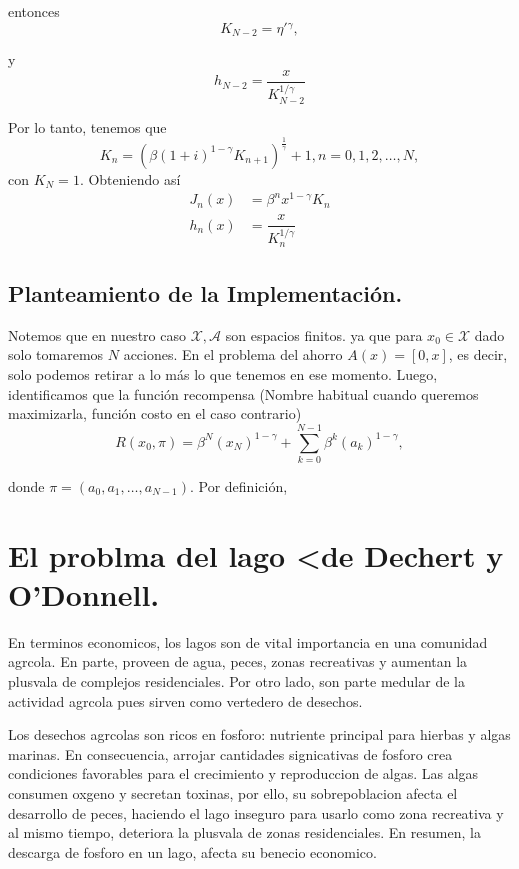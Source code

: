 \documentclass[oneside,spanish]{amsbook}
\numberwithin{section}{chapter}
\numberwithin{equation}{section}
\numberwithin{figure}{section}
\begin{document}
entonces 
\[
K_{N-2}=\eta'{}^{\gamma},
\]

y 
\[
h_{N-2}=\dfrac{x}{K_{N-2}^{1/\gamma}}
\]

Por lo tanto, tenemos que 
\[
K_{n}=\left(\beta\left(1+i\right)^{1-\gamma}K_{n+1}\right)^{\frac{1}{\gamma}}+1,n=0,1,2,\ldots,N,
\]
con $K_{N}=1$. Obteniendo así 
\begin{align*}
J_{n}\left(x\right) & =\beta^{n}x^{1-\gamma}K_{n}\\
h_{n}\left(x\right) & =\dfrac{x}{K_{n}^{1/\gamma}}
\end{align*}


\section{Planteamiento de la Implementación. }

Notemos que en nuestro caso $\mathcal{X},\mathcal{A}$ son espacios
finitos. ya que para $x_{0}\in\mathcal{X}$ dado solo tomaremos $N$
acciones. En el problema del ahorro $A\left(x\right)=[0,x]$, es decir,
solo podemos retirar a lo más lo que tenemos en ese momento. Luego,
identificamos que la función recompensa (Nombre habitual cuando queremos
maximizarla, función costo en el caso contrario)
\[
R\left(x_{0},\pi\right)=\beta^{N}\left(x_{N}\right)^{1-\gamma}+\sum_{k=0}^{N-1}\beta^{k}\left(a_{k}\right)^{1-\gamma},
\]

donde $\pi=\left(a_{0},a_{1},\ldots,a_{N-1}\right)$. Por definición, 

\chapter{El problma del lago <de Dechert y O'Donnell.}

En terminos economicos, los lagos son de vital importancia en una
comunidad agrcola. En parte, proveen de agua, peces, zonas recreativas
y aumentan la plusvala de complejos residenciales. Por otro lado,
son parte medular de la actividad agrcola pues sirven como vertedero
de desechos. 

Los desechos agrcolas son ricos en fosforo: nutriente principal para
hierbas y algas marinas. En consecuencia, arrojar cantidades signicativas
de fosforo crea condiciones favorables para el crecimiento y reproduccion
de algas. Las algas consumen oxgeno y secretan toxinas, por ello,
su sobrepoblacion afecta el desarrollo de peces, haciendo el lago
inseguro para usarlo como zona recreativa y al mismo tiempo, deteriora
la plusvala de zonas residenciales. En resumen, la descarga de fosforo
en un lago, afecta su benecio economico. 
\end{document}
